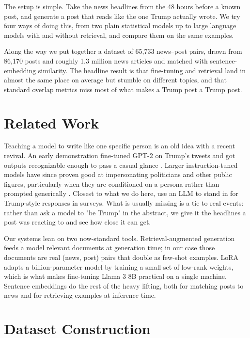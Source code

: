 \documentclass[11pt,a4paper]{article}
\begin{document}
The setup is simple. Take the news headlines from the 48 hours before a known post, and generate a post that reads like the one Trump actually wrote. We try four ways of doing this, from two plain statistical models up to large language models with and without retrieval, and compare them on the same examples.

Along the way we put together a dataset of 65,733 news--post pairs, drawn from 86,170 posts and roughly 1.3 million news articles and matched with sentence-embedding similarity. The headline result is that fine-tuning and retrieval land in almost the same place on average but stumble on different topics, and that standard overlap metrics miss most of what makes a Trump post a Trump post.

\section{Related Work}

Teaching a model to write like one specific person is an old idea with a recent revival. An early demonstration fine-tuned GPT-2 on Trump's tweets and got outputs recognizable enough to pass a casual glance \citep{gpt2trump}. Larger instruction-tuned models have since proven good at impersonating politicians and other public figures, particularly when they are conditioned on a persona rather than prompted generically \citep{herbold2024impersonate}. Closest to what we do here, \citet{jiang2024trumppolls} use an LLM to stand in for Trump-style responses in surveys. What is usually missing is a tie to real events: rather than ask a model to "be Trump" in the abstract, we give it the headlines a post was reacting to and see how close it can get.

Our systems lean on two now-standard tools. Retrieval-augmented generation \citep{lewis2020retrieval} feeds a model relevant documents at generation time; in our case those documents are real (news, post) pairs that double as few-shot examples. LoRA \citep{hu2022lora} adapts a billion-parameter model by training a small set of low-rank weights, which is what makes fine-tuning Llama 3 8B practical on a single machine. Sentence embeddings \citep{reimers2019sentence} do the rest of the heavy lifting, both for matching posts to news and for retrieving examples at inference time.

\section{Dataset Construction}
\end{document}
